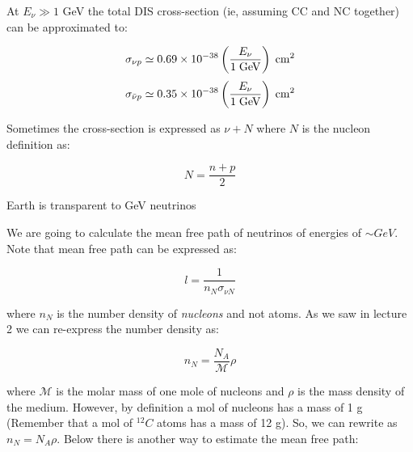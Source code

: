 \documentclass[
  letterpaper,
  DIV=11,
  numbers=noendperiod]{scrreprt}
\begin{document}
At \(E_\nu \gg 1\) GeV the total DIS cross-section (ie, assuming CC and
NC together) can be approximated to:

\[\sigma_{\nu p} \simeq 0.69 \times 10^{-38} \left(\frac{E_\nu}{ 1 \rm{\; GeV}}\right) \rm{ \; cm}^2\]
\[\sigma_{\bar{\nu} p} \simeq 0.35 \times 10^{-38}\left(\frac{E_\nu}{ 1 \rm{\; GeV}}\right) \rm{ \; cm}^2\]

Sometimes the cross-section is expressed as \(\nu + N\) where \(N\) is
the nucleon definition as:

\[N = \frac{n+p}{2}\]

Earth is transparent to GeV neutrinos

We are going to calculate the mean free path of neutrinos of energies of
\(\sim GeV\). Note that mean free path can be expressed as:

\[l = \frac{1}{n_N \sigma_{\nu N}}\]

where \(n_N\) is the number density of \emph{nucleons} and not atoms. As
we saw in lecture 2 we can re-express the number density as:

\[n_N = \frac{N_A}{\mathcal{M}}\rho\]

where \(\mathcal{M}\) is the molar mass of one mole of nucleons and
\(\rho\) is the mass density of the medium. However, by definition a mol
of nucleons has a mass of 1 g (Remember that a mol of \(^{12}C\) atoms
has a mass of 12 g). So, we can rewrite as \(n_N = N_A \rho\). Below
there is another way to estimate the mean free path:
\end{document}
